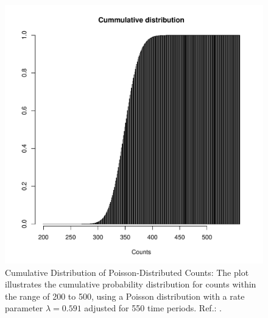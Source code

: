 \begin{figure}
\begin{knitrout}
\color{fgcolor}

{\centering \includegraphics[width=\textwidth-3cm]{figure/ch02_figunnamed-chunk-5-1} 

}


\end{knitrout}
  \caption{Cumulative Distribution of Poisson-Distributed Counts: The plot illustrates the cumulative probability distribution for counts within the range of 200 to 500, using a Poisson distribution with a rate parameter $\lambda = 0.591$ adjusted for 550 time periods. Ref.: .}
  \label{fig:2_4}
\end{figure}


